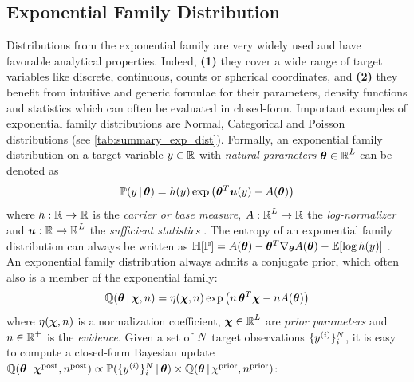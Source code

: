 \subsection{Exponential Family Distribution}
Distributions from the exponential family are very widely used and have favorable analytical properties. Indeed, \textbf{(1)} they cover a wide range of target variables like discrete, continuous, counts or spherical coordinates, and \textbf{(2)} they benefit from intuitive and generic formulae for their parameters, density functions and statistics which can often be evaluated in closed-form. Important examples of exponential family distributions are Normal, Categorical and Poisson distributions (see \cref{tab:summary_exp_dist}). Formally, an exponential family distribution on a target variable $y \in \operatorname{\mathbb{R}}$ with \emph{natural parameters} $\bm{\theta} \in \operatorname{\mathbb{R}}^L$ can be denoted as
%
\begin{equation}\label{eq:exponential-family}
    \operatorname{\mathbb{P}}(y \,|\, \bm{\theta}) = h(y) \exp\left(\bm{\theta}^T \bm{u}(y) - A(\bm{\theta})\right)
\end{equation}
%
where ${h: \operatorname{\mathbb{R}} \rightarrow \operatorname{\mathbb{R}}}$ is the \emph{carrier or base measure}, ${A: \operatorname{\mathbb{R}}^L \rightarrow \operatorname{\mathbb{R}}}$ the \emph{log-normalizer} and ${\bm{u}: \operatorname{\mathbb{R}} \rightarrow \operatorname{\mathbb{R}}^L}$ the \emph{sufficient statistics} \citep{bishop,exponential-entropy}. The entropy of an exponential family distribution can always be written as $\operatorname{\mathbb{H}}[\operatorname{\mathbb{P}}] = A(\bm{\theta}) - \bm{\theta}^T \nabla_{\bm{\theta}}A(\bm{\theta}) - \operatorname{\mathbb{E}}[\log{h(y)}]$ \citep{exponential-entropy}.
An exponential family distribution always admits a conjugate prior, which often also is a member of the exponential family:
%
\begin{equation}\label{eq:prior}
    \operatorname{\mathbb{Q}}(\bm{\theta} \,|\, \bm{\chi}, n) = \eta(\bm{\chi}, n) \exp\left( n \, \bm{\theta}^T\bm{\chi}  - n A(\bm{\theta}) \right)
\end{equation}
%
where $\eta(\bm{\chi}, n)$ is a normalization coefficient, $\bm{\chi} \in \operatorname{\mathbb{R}}^L$ are \emph{prior parameters} and $n \in \operatorname{\mathbb{R}}^+$ is the \emph{evidence}. Given a set of $N$ target observations $\{y^{(i)}\}_{i}^{N}$, it is easy to compute a closed-form Bayesian update $\operatorname{\mathbb{Q}}(\bm{\theta} \,|\, \bm{\chi}^\text{post}, n^\text{post}) \propto \operatorname{\mathbb{P}}(\{y^{(i)}\}_{i}^{N} \,|\, \bm{\theta}) \times \operatorname{\mathbb{Q}}(\bm{\theta} \,|\, \chi^\text{prior}, n^\text{prior})$:
